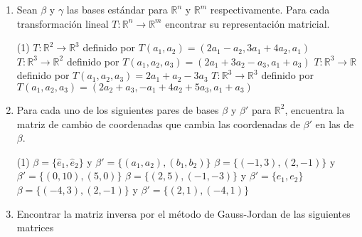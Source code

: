 \documentclass[letterpaper,11pt]{article}
\begin{document}
\begin{enumerate}


 
\item Sean $\beta$ y $\gamma$ las bases estándar para $\mathbb{R}^{n}$ y $\mathbb{R}^{m}$ respectivamente. Para cada transformación lineal $T: \mathbb{R}^{n} \longrightarrow \mathbb{R}^{m}$ encontrar su representación matricial.
\begin{tasks}(1)
\task $T: \mathbb{R}^{2} \longrightarrow \mathbb{R}^{3}$ definido por $T(a_{1},a_{2}) = (2a_{1} - a_{2}, 3a_{1} + 4a_{2},a_{1})$
\task $T: \mathbb{R}^{3} \longrightarrow \mathbb{R}^{2}$ definido por $T(a_{1},a_{2},a_{3}) = (2a_{1} + 3a_{2} - a_{3}, a_{1} + a_{3})$
\task $T: \mathbb{R}^{3} \longrightarrow \mathbb{R}$ definido por $T(a_{1},a_{2},a_{3}) = 2a_{1} + a_{2} - 3a_{3}$
\task $T: \mathbb{R}^{3} \longrightarrow \mathbb{R}^{3}$ definido por $T(a_{1},a_{2},a_{3}) = (2a_{2} + a_{3}, -a_{1} + 4a_{2} + 5a_{3},a_{1} + a_{3})$
\end{tasks}

\newpage
\item Para cada uno de los siguientes pares de bases $\beta$ y $\beta'$ para $\mathbb{R}^{2}$, encuentra la matriz de cambio de coordenadas que cambia las coordenadas de $\beta'$ en las de $\beta$.

\begin{tasks}(1)
\task $\beta = \lbrace \hat{e}_{1},\hat{e}_{2} \rbrace$ y $\beta' = \lbrace (a_{1},a_{2}),(b_{1},b_{2}) \rbrace$
\task $\beta = \lbrace (-1,3),(2,-1) \rbrace$ y $\beta' = \lbrace (0,10),(5,0) \rbrace$
\task $\beta = \lbrace (2,5),(-1,-3) \rbrace$ y $\beta' = \lbrace e_{1},e_{2} \rbrace$
\task $\beta = \lbrace (-4,3),(2,-1) \rbrace$ y $\beta' = \lbrace (2,1),(-4,1) \rbrace$
\end{tasks}

\item Encontrar la matriz inversa por el método de Gauss-Jordan de las siguientes matrices 


\end{enumerate}
\end{document}
